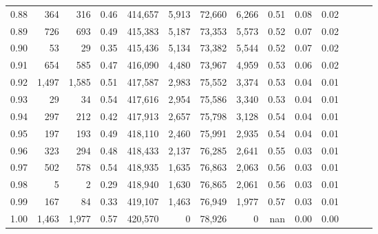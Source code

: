 \begin{tabular}{rrrrrrrrrrrrrr}
0.88 &     364 &    316 &  0.46 &  414,657 &    5,913 &  72,660 &   6,266 &  0.51 &  0.08 &      0.02 \\
0.89 &     726 &    693 &  0.49 &  415,383 &    5,187 &  73,353 &   5,573 &  0.52 &  0.07 &      0.02 \\
0.90 &      53 &     29 &  0.35 &  415,436 &    5,134 &  73,382 &   5,544 &  0.52 &  0.07 &      0.02 \\
0.91 &     654 &    585 &  0.47 &  416,090 &    4,480 &  73,967 &   4,959 &  0.53 &  0.06 &      0.02 \\
0.92 &   1,497 &  1,585 &  0.51 &  417,587 &    2,983 &  75,552 &   3,374 &  0.53 &  0.04 &      0.01 \\
0.93 &      29 &     34 &  0.54 &  417,616 &    2,954 &  75,586 &   3,340 &  0.53 &  0.04 &      0.01 \\
0.94 &     297 &    212 &  0.42 &  417,913 &    2,657 &  75,798 &   3,128 &  0.54 &  0.04 &      0.01 \\
0.95 &     197 &    193 &  0.49 &  418,110 &    2,460 &  75,991 &   2,935 &  0.54 &  0.04 &      0.01 \\
0.96 &     323 &    294 &  0.48 &  418,433 &    2,137 &  76,285 &   2,641 &  0.55 &  0.03 &      0.01 \\
0.97 &     502 &    578 &  0.54 &  418,935 &    1,635 &  76,863 &   2,063 &  0.56 &  0.03 &      0.01 \\
0.98 &       5 &      2 &  0.29 &  418,940 &    1,630 &  76,865 &   2,061 &  0.56 &  0.03 &      0.01 \\
0.99 &     167 &     84 &  0.33 &  419,107 &    1,463 &  76,949 &   1,977 &  0.57 &  0.03 &      0.01 \\
1.00 &   1,463 &  1,977 &  0.57 &  420,570 &        0 &  78,926 &       0 &   nan &  0.00 &      0.00 \\
\bottomrule
\end{tabular}
